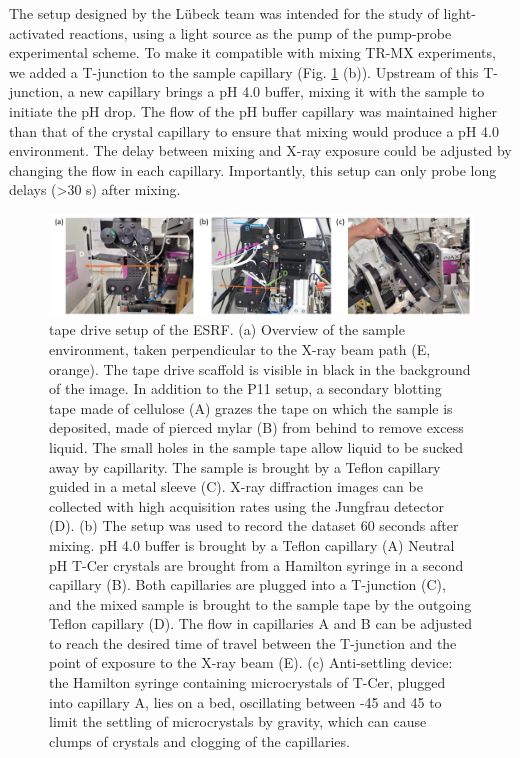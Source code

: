 The setup designed by the Lübeck team was intended for the study of light-activated reactions, using a light source as the pump of the pump-probe experimental scheme. To make it compatible with mixing TR-MX experiments, we added a T-junction to the sample capillary (Fig. \ref{fig:ID29_tpd} (b)). Upstream of this T-junction, a new capillary brings a pH 4.0 buffer, mixing it with the sample to initiate the pH drop. The flow of the pH buffer capillary was maintained higher than that of the crystal capillary to ensure that mixing would produce a pH 4.0 environment. The delay between mixing and X-ray exposure could be adjusted by changing the flow in each capillary. Importantly, this setup can only probe long delays (>30 s) after mixing.
\begin{figure}[H] 
    \centering
        \noindent \includegraphics[width=\textwidth]{images/T-Cer/ID29_tape-drive.pdf}
    \caption{tape drive setup of the ESRF. (a) Overview of the sample environment, taken perpendicular to the X-ray beam path (E, orange). The tape drive scaffold is visible in black in the background of the image. In addition to the P11 setup, a secondary blotting tape made of cellulose (A) grazes the tape on which the sample is deposited, made of pierced mylar (B) from behind to remove excess liquid. The small holes in the sample tape allow liquid to be sucked away by capillarity. The sample is brought by a Teflon capillary guided in a metal sleeve (C). X-ray diffraction images can be collected with high acquisition rates using the Jungfrau detector (D). (b) The setup was used to record the dataset 60 seconds after mixing. pH 4.0 buffer is brought by a Teflon capillary (A)  Neutral pH T-Cer crystals are brought from a Hamilton syringe in a second capillary (B). Both capillaries are plugged into a T-junction (C), and the mixed sample is brought to the sample tape by the outgoing Teflon capillary (D). The flow in capillaries A and B can be adjusted to reach the desired time of travel between the T-junction and the point of exposure to the X-ray beam (E). (c) Anti-settling device: the Hamilton syringe containing microcrystals of T-Cer, plugged into capillary A, lies on a bed, oscillating between -45 \degree and 45 \degree to limit the settling of microcrystals by gravity, which can cause clumps of crystals and clogging of the capillaries.}\label{fig:ID29_tpd}
\end{figure}

